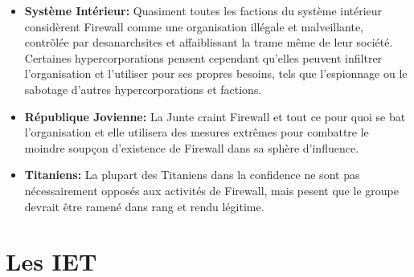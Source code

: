 \begin{itemize}
   \item \textbf{Système Intérieur:} Quasiment toutes les factions du système intérieur considèrent Firewall comme une organisation illégale et malveillante, contrõlée par desanarchsites et affaiblissant la trame même de leur société. Certaines hypercorporations pensent cependant qu'elles peuvent infiltrer l'organisation et l'utiliser pour ses propres besoins, tels que l'espionnage ou le sabotage d'autres hypercorporations et factions.
   \item \textbf{République Jovienne:} La Junte craint Firewall et tout ce pour quoi se bat l'organisation et elle utilisera des mesures extrêmes pour combattre le moindre soupçon d'existence de Firewall dans sa sphère d'influence.
   \item \textbf{Titaniens:} La plupart des Titaniens dans la confidence ne sont pas nécessairement opposés aux activités de Firewall, mais pesent que le groupe devrait être ramené dans rang et rendu légitime.
\end{itemize} 



\section{Les IET } 

